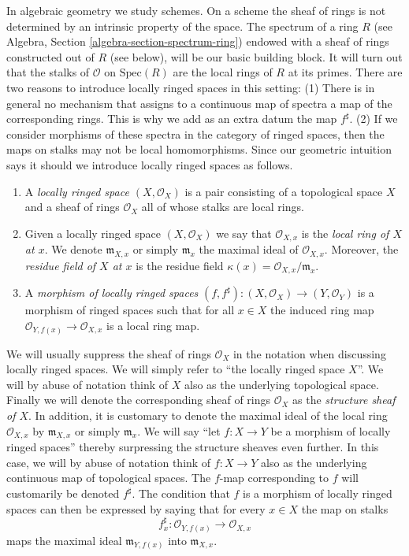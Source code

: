 \medskip\noindent
In algebraic geometry we study schemes. On a scheme the sheaf of rings
is not determined by an intrinsic property of the space.
The spectrum of a ring $R$
(see Algebra, Section \ref{algebra-section-spectrum-ring}) endowed
with a sheaf of rings constructed out of $R$ (see below),
will be our basic building block. It will turn out that
the stalks of $\mathcal{O}$ on $\text{Spec}(R)$ are the local
rings of $R$ at its primes. There are two reasons to introduce
locally ringed spaces in this setting: (1) There is in general
no mechanism that assigns to a continuous map of spectra a
map of the corresponding rings. This is why we add as an extra datum
the map $f^\sharp$. (2) If we consider morphisms
of these spectra in the category of ringed spaces, then the
maps on stalks may not be local homomorphisms. Since our
geometric intuition says it should we introduce locally ringed spaces
as follows.

\begin{definition}
\label{definition-locally-ringed-space}
\begin{enumerate}
\item A {\it locally ringed space $(X,\mathcal{O}_X)$}
is a pair consisting of a
topological space $X$ and a sheaf of rings $\mathcal{O}_X$ all of whose stalks
are local rings.
\item Given a locally ringed space $(X, \mathcal{O}_X)$ we say that
$\mathcal{O}_{X, x}$ is the {\it local ring of $X$ at $x$}.
We denote $\mathfrak{m}_{X,x}$ or simply $\mathfrak{m}_x$
the maximal ideal of $\mathcal{O}_{X, x}$. Moreover, the
{\it residue field of $X$ at $x$} is the residue field
$\kappa(x) = \mathcal{O}_{X, x}/\mathfrak{m}_x$.
\item A {\it morphism of locally ringed spaces}
$(f, f^\sharp) : (X, \mathcal{O}_X) \to (Y,\mathcal{O}_Y)$
is a morphism of ringed spaces such that for all $x \in X$
the induced ring map $\mathcal{O}_{Y,f(x)} \to \mathcal{O}_{X,x}$ is a
local ring map.
\end{enumerate}
\end{definition}

\noindent
We will usually suppress the sheaf of rings $\mathcal{O}_X$
in the notation when discussing locally ringed spaces. We will
simply refer to ``the locally ringed space $X$''.
We will by abuse of notation think of $X$ also as
the underlying topological space. Finally we will denote
the corresponding sheaf of rings
$\mathcal{O}_X$ as the {\it structure sheaf of $X$}.
In addition, it is customary to denote the maximal ideal
of the local ring $\mathcal{O}_{X, x}$ by
$\mathfrak{m}_{X,x}$ or simply $\mathfrak{m}_x$.
We will say ``let $f : X \to Y$ be a morphism of locally ringed
spaces'' thereby surpressing the structure sheaves even further.
In this case, we will by abuse of notation think of $f : X\to Y$
also as the underlying continuous map of topological spaces.
The $f$-map corresponding to $f$ will customarily
be denoted $f^\sharp$. The condition that $f$ is a morphism
of locally ringed spaces can then be expressed by saying that
for every $x\in X$ the map on stalks
$$
f^\sharp_x : \mathcal{O}_{Y,f(x)} \longrightarrow \mathcal{O}_{X, x}
$$
maps the maximal ideal $\mathfrak m_{Y, f(x)}$ into
$\mathfrak m_{X, x}$.

